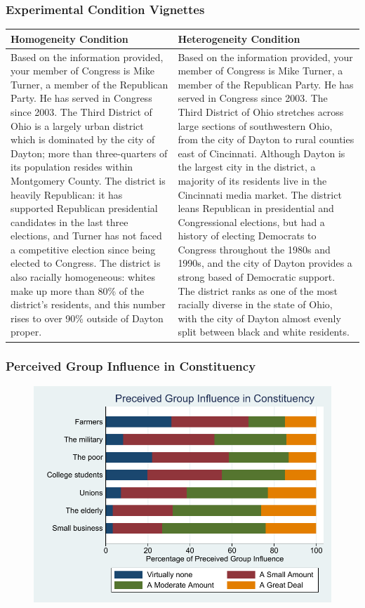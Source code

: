 \documentclass[14pt]{beamer}
\newcommand\tb{\textbf}
\begin{document}
\begin{frame}
\frametitle{Experimental Condition Vignettes}
\scriptsize
\begin{table}
	\centering
	\begin{tabulary}{\linewidth}{p{5.5cm}p{5.5cm}}
	\\
	\hline
	\tb{Homogeneity Condition}&\tb{Heterogeneity Condition} \\
	\hline
	Based on the information provided, your member of Congress is Mike Turner, a member of the Republican Party. He has served in Congress since 2003. The Third District of Ohio is a largely urban district which is dominated by the city of Dayton; more than three-quarters of its population resides within Montgomery County. The district is heavily Republican: it has supported Republican presidential candidates in the last three elections, and Turner has not faced a competitive election since being elected to Congress. The district is also racially homogeneous: whites make up more than 80\% of the district’s residents, and this number rises to over 90\% outside of Dayton proper.&Based on the information provided, your member of Congress is Mike Turner, a member of the Republican Party. He has served in Congress since 2003. The Third District of Ohio stretches across large sections of southwestern Ohio, from the city of Dayton to rural counties east of Cincinnati. Although Dayton is the largest city in the district, a majority of its residents live in the Cincinnati media market. The district leans Republican in presidential and Congressional elections, but had a history of electing Democrats to Congress throughout the 1980s and 1990s, and the city of Dayton provides a strong based of Democratic support. The district ranks as one of the most racially diverse in the state of Ohio, with the city of Dayton almost evenly split between black and white residents.\\
	\hline
	\end{tabulary}
\end{table}
\end{frame}



\begin{frame}
\frametitle{Perceived Group Influence in Constituency}
\begin{figure}
	\centering
	{\includegraphics[width=.8\textwidth]{fig1color}}
\end{figure}
\end{frame}
\end{document}
